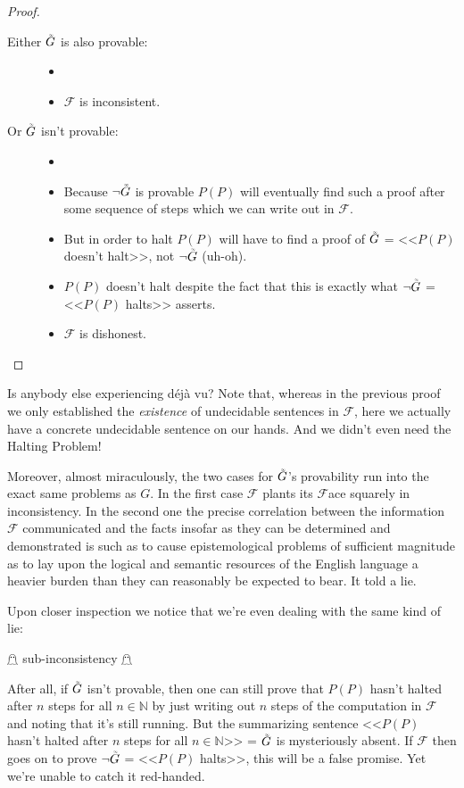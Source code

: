 \documentclass{article}
\theoremstyle{customstyle}
\newcommand{\F}{\ensuremath{\mathcal{F}}}
\newcommand{\iGoedel}{\ensuremath{\accentset{\scalebox{0.35}{$\infty$}}{G}}}
\begin{document}
\begin{proof}
\begin{description}
\begin{description}
\item[]
\item[Either $\iGoedel$ is also provable:]
\begin{itemize}
\item[]
\item $\F$ is inconsistent. \lightning
\end{itemize}
\item[Or $\iGoedel$ isn't provable:]
\begin{itemize}
\item[]
\item Because $\neg \iGoedel$ is provable $P(P)$ will eventually find such a proof after some sequence of steps which we can write out in $\F$.
\item But in order to halt $P(P)$ will have to find a proof of $\iGoedel$ = <<$P(P)$ doesn't halt>>, not $\neg \iGoedel$ (uh-oh).
\item $P(P)$ doesn't halt despite the fact that this is exactly what $\neg \iGoedel$ = <<$P(P)$ halts>> asserts.
\item $\F$ is dishonest. \lightning
\end{itemize}
\end{description}
\end{description}
\end{proof}

Is anybody else experiencing déjà vu? Note that, whereas in the previous proof we only established the \textit{existence} of undecidable sentences in $\F$, here we actually have a concrete undecidable sentence on our hands. And we didn't even need the Halting Problem!

Moreover, almost miraculously, the two cases for $\iGoedel$'s provability run into the exact same problems as $G$. In the first case $\F$ plants its $\F$ace squarely in inconsistency. In the second one the precise correlation between the information $\F$ communicated and the facts insofar as they can be determined and demonstrated is such as to cause epistemological problems of sufficient magnitude as to lay upon the logical and semantic resources of the English language a heavier burden than they can reasonably be expected to bear. It told a lie.\cite{yes-prime-minister}

Upon closer inspection we notice that we're even dealing with the same kind of lie:
\begin{center}
$\mathghost$ sub-inconsistency $\mathghost$
\end{center}
After all, if $\iGoedel$ isn't provable, then one can still prove that $P(P)$ hasn't halted after $n$ steps for all $n\in\mathbb{N}$ by just writing out $n$ steps of the computation in $\F$ and noting that it's still running. But the summarizing sentence <<$P(P)$ hasn't halted after $n$ steps for all $n\in\mathbb{N}$>> = $\iGoedel$ is mysteriously absent. If $\F$ then goes on to prove $\neg \iGoedel$ = <<$P(P)$ halts>>, this will be a false promise. Yet we're unable to catch it red-handed.
\end{document}
